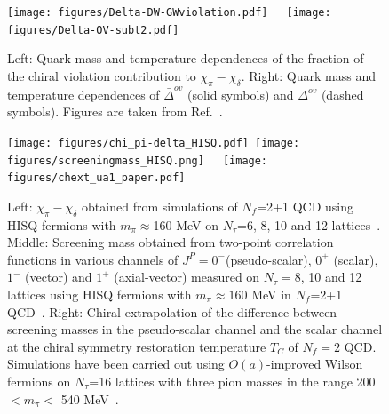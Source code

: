 \documentclass{PoS}
\begin{document}
\begin{figure}[htp]
\begin{center}
\texttt{[image: figures/Delta-DW-GWviolation.pdf]}~~~\texttt{[image: figures/Delta-OV-subt2.pdf]}~
\end{center}
\caption{Left: Quark mass and temperature dependences of the fraction of the chiral violation contribution to $\chi_\pi-\chi_\delta$. Right: Quark mass and temperature dependences of $\bar{\Delta}^{ov}$ (solid symbols) and ${\Delta}^{ov}$ (dashed symbols). Figures are taken from Ref.~\cite{Tomiya:2016jwr}. }
\label{fig:JLQCD}
\end{figure}


\begin{figure}[htp]
\begin{center}
\texttt{[image: figures/chi\_pi-delta\_HISQ.pdf]}~\texttt{[image: figures/screeningmass\_HISQ.png]}~~~\texttt{[image: figures/chext\_ua1\_paper.pdf]}~
\end{center}
\caption{Left:  $\chi_\pi-\chi_\delta$ obtained from simulations of $N_f$=2+1 QCD using HISQ fermions with $m_\pi\approx$160 MeV on $N_\tau$=6, 8, 10 and 12 lattices~\cite{Petreczky:2016vrs}. Middle: Screening mass obtained from two-point correlation functions in various channels of $J^{P}=0^{-}$(pseudo-scalar), $0^{+}$ (scalar), $1^{-}$ (vector) and $1^{+}$ (axial-vector) measured on $N_\tau=8$, 10 and 12 lattices using HISQ fermions with $m_\pi\approx160$ MeV in $N_f$=2+1 QCD~\cite{Maezawa2016}. 
Right: Chiral extrapolation of the difference between screening masses in the pseudo-scalar channel and the scalar channel at the chiral symmetry restoration temperature $T_C$ of $N_f=2$ QCD. Simulations have been carried out using $O(a)$-improved Wilson fermions on $N_\tau$=16 lattices with three pion masses in the range 200 $<m_\pi <$ 540 MeV~\cite{Brandt:2016daq}.}
\label{fig:NonchiralU1}
\end{figure}
\end{document}
